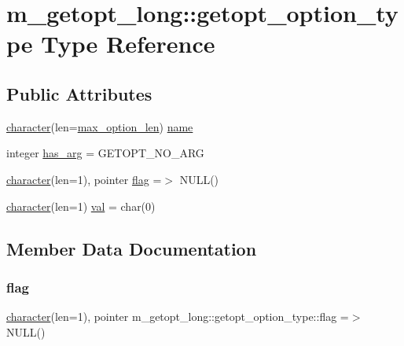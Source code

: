 \hypertarget{structm__getopt__long_1_1getopt__option__type}{}\section{m\+\_\+getopt\+\_\+long\+:\+:getopt\+\_\+option\+\_\+type Type Reference}
\label{structm__getopt__long_1_1getopt__option__type}
\subsection*{Public Attributes}
\begin{DoxyCompactItemize}
\item 
\hyperlink{option__stopwatch_83_8txt_abd4b21fbbd175834027b5224bfe97e66}{character}(len=\hyperlink{namespacem__getopt__long_aa7e9d6f7c81a30df80cba5f518928d0b}{max\+\_\+option\+\_\+len}) \hyperlink{structm__getopt__long_1_1getopt__option__type_a720c329e86ed4d08630f50b0825c50ea}{name}
\item 
integer \hyperlink{structm__getopt__long_1_1getopt__option__type_a60fac9bca3cbf204a9f53e6117c70d64}{has\+\_\+arg} = G\+E\+T\+O\+P\+T\+\_\+\+N\+O\+\_\+\+A\+RG
\item 
\hyperlink{option__stopwatch_83_8txt_abd4b21fbbd175834027b5224bfe97e66}{character}(len=1), pointer \hyperlink{structm__getopt__long_1_1getopt__option__type_a2bfd20d64474174eb53e6f9380d3790d}{flag} =$>$ N\+U\+LL()
\item 
\hyperlink{option__stopwatch_83_8txt_abd4b21fbbd175834027b5224bfe97e66}{character}(len=1) \hyperlink{structm__getopt__long_1_1getopt__option__type_a2c93173986363bc5bd72cc31605a2851}{val} = char(0)
\end{DoxyCompactItemize}


\subsection{Member Data Documentation}
\mbox{\label{structm__getopt__long_1_1getopt__option__type_a2bfd20d64474174eb53e6f9380d3790d}} 
\subsubsection{\texorpdfstring{flag}{flag}}
{\footnotesize\ttfamily \hyperlink{option__stopwatch_83_8txt_abd4b21fbbd175834027b5224bfe97e66}{character}(len=1), pointer m\+\_\+getopt\+\_\+long\+::getopt\+\_\+option\+\_\+type\+::flag =$>$ N\+U\+LL()}


